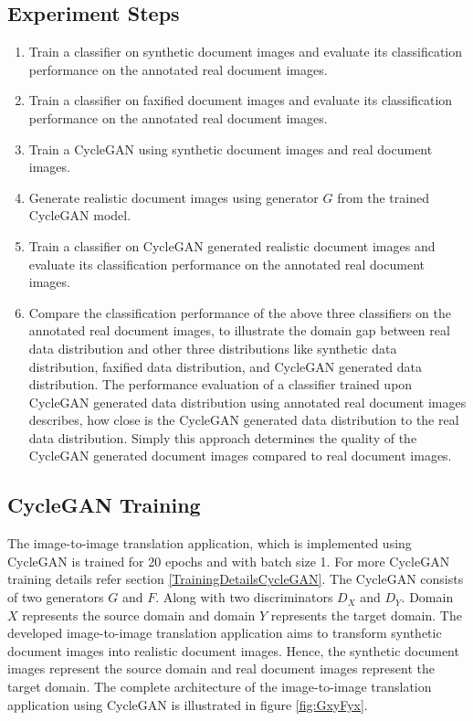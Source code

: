 \subsection{Experiment Steps}


\begin{enumerate}
    \itemsep0em 
    \item Train a classifier on synthetic document images and evaluate its classification performance on the annotated real document images.
    \item Train a classifier on faxified document images and evaluate its classification performance on the annotated real document images.
    \item Train a \ac{CycleGAN} using synthetic document images and real document images.
    \item Generate realistic document images using generator $G$ from the trained \ac{CycleGAN} model.
    \item Train a classifier on \ac{CycleGAN} generated realistic document images and evaluate its classification performance on the annotated real document images.
    \item Compare the classification performance of the above three classifiers on the annotated real document images, to illustrate the domain gap between real data distribution and other three distributions like synthetic data distribution, faxified data distribution, and \ac{CycleGAN} generated data distribution. The performance evaluation of a classifier trained upon \ac{CycleGAN} generated data distribution using annotated real document images describes, how close is the \ac{CycleGAN} generated data distribution to the real data distribution. Simply this approach determines the quality of the \ac{CycleGAN} generated document images compared to real document images.
\end{enumerate}


\subsection{\ac{CycleGAN} Training}

The image-to-image translation application, which is implemented using \ac{CycleGAN} is trained for 20 epochs and with batch size 1. For more \ac{CycleGAN} training details refer section \ref{TrainingDetailsCycleGAN}. The \ac{CycleGAN} consists of two generators $G$ and $F$. Along with two discriminators $D_X$ and $D_Y$. Domain $X$ represents the source domain and domain $Y$ represents the target domain. The developed image-to-image translation application aims to transform synthetic document images into realistic document images. Hence, the synthetic document images represent the source domain and real document images represent the target domain. The complete architecture of the image-to-image translation application using \ac{CycleGAN} is illustrated in figure \ref{fig:GxyFyx}.

